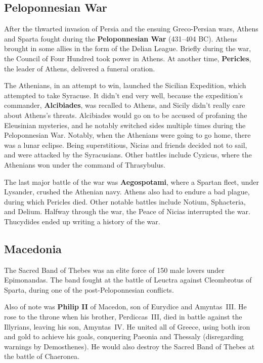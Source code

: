 \subsection*{Peloponnesian War}

After the thwarted invasion of Persia and the ensuing Greco-Persian wars,
Athens and Sparta fought during the \textbf{Peloponnesian War} (431--404 BC).
Athens brought in some allies in the form of the Delian League.
Briefly during the war, the Council of Four Hundred took power in Athens.
At another time, \textbf{Pericles}, the leader of Athens, delivered a funeral oration.

The Athenians, in an attempt to win, launched the Sicilian Expedition, which attempted to take Syracuse.
It didn't end very well, because the expedition's commander, \textbf{Alcibiades}, was recalled to Athens,
and Sicily didn't really care about Athens's threats.
Alcibiades would go on to be accused of profaning the Eleusinian mysteries,
and he notably switched sides multiple times during the Peloponnesian War.
Notably, when the Athenians were going to go home, there was a lunar eclipse.
Being superstitious, Nicias and friends decided not to sail, and were attacked by the Syracusians.
Other battles include Cyzicus, where the Athenians won under the command of Thrasybulus.

The last major battle of the war was \textbf{Aegospotami}, where a Spartan fleet,
under Lysander, crushed the Athenian navy.
Athens also had to endure a bad plague, during which Pericles died.
Other notable battles include Notium, Sphacteria, and Delium.
Halfway through the war, the Peace of Nicias interrupted the war.
Thucydides ended up writing a history of the war.

\subsection*{Macedonia}

The Sacred Band of Thebes was an elite force of 150 male lovers under Epimonandas.
The band fought at the battle of Leuctra against Cleombrotus of Sparta, during one of the post-Peloponnesian conflicts.

Also of note was \textbf{Philip II} of Macedon, son of Eurydice and Amyntas~III\@.
He rose to the throne when his brother, Perdiccas~III,
died in battle against the Illyrians, leaving his son, Amyntas~IV\@.
He united all of Greece, using both iron and gold to achieve his goals,
conquering Paeonia and Thessaly (disregarding warnings by Demosthenes).
He would also destroy the Sacred Band of Thebes at the battle of Chaeronea.

